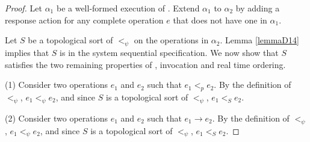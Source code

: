 \begin{proof}
    Let $\alpha_1$ be a well-formed execution of \sys{}. Extend $\alpha_1$ to $\alpha_2$ by adding a response action for any complete operation $e$ that does not have one in $\alpha_1$.

    Let $S$ be a topological sort of $<_\psi$ on the operations in $\alpha_2$. Lemma \ref{lemmaD14} implies that $S$ is in the system sequential specification. We now show that $S$ satisfies the two remaining properties of \mdllong{}, invocation and real time ordering.

    (1) Consider two operations $e_1$ and $e_2$ such that $e_1 <_p e_2$. By the definition of $<_\psi$, $e_1 <_\psi e_2$, and since $S$ is a topological sort of $<_\psi$, $e_1 <_S e_2$.
    
    (2) Consider two operations $e_1$ and $e_2$ such that $e_1 \rightarrow e_2$. By the definition of $<_\psi$, $e_1 <_\psi e_2$, and since $S$ is a topological sort of $<_\psi$, $e_1 <_S e_2$.
\end{proof}
